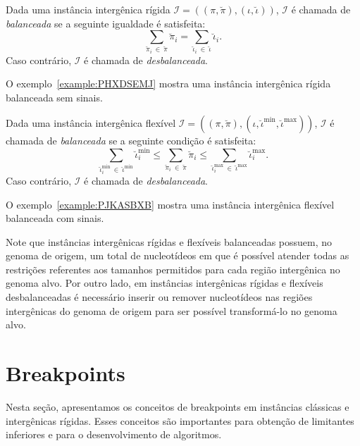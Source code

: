 

\begin{definition}
  Dada uma instância intergênica rígida $\mathcal{I} = ((\pi,\breve\pi),(\iota,\breve\iota))$, $\mathcal{I}$ é chamada de \emph{balanceada} se a seguinte igualdade é satisfeita: 
  $$\sum_{\breve\pi_i~\in~\breve\pi}\breve\pi_i = \sum_{\breve\iota_i~\in~\breve\iota}\breve\iota_i.$$
  Caso contrário, $\mathcal{I}$ é chamada de \emph{desbalanceada}.
\end{definition}

O exemplo~\ref{example:PHXDSEMJ} mostra uma instância intergênica rígida balanceada sem sinais.



\begin{definition}
  Dada uma instância intergênica flexível $\mathcal{I} = ((\pi,\breve\pi),(\iota,\breve\iota^{\min},\breve\iota^{\max}))$, $\mathcal{I}$ é chamada de \emph{balanceada} se a seguinte condição é satisfeita: 
  $$\sum_{\breve\iota^{\min}_i~\in~\breve\iota^{\min}} \breve\iota^{\min}_i \le \sum_{\breve\pi_i~\in~\breve\pi} \breve\pi_i \le \sum_{\breve\iota^{\max}_i~\in~\breve\iota^{\max}}{\breve\iota^{\max}_i}.$$
  Caso contrário, $\mathcal{I}$ é chamada de \emph{desbalanceada}.
\end{definition}

O exemplo~\ref{example:PJKASBXB} mostra uma instância intergênica flexível balanceada com sinais.



Note que instâncias intergênicas rígidas e flexíveis balanceadas possuem, no genoma de origem, um total de nucleotídeos em que é possível atender todas as restrições referentes aos tamanhos permitidos para cada região intergênica no genoma alvo. Por outro lado, em instâncias intergênicas rígidas e flexíveis desbalanceadas é necessário inserir ou remover nucleotídeos nas regiões intergênicas do genoma de origem para ser possível transformá-lo no genoma alvo.

\section{Breakpoints}

Nesta seção, apresentamos os conceitos de breakpoints em instâncias clássicas e intergênicas rígidas. Esses conceitos são importantes para obtenção de limitantes inferiores e para o desenvolvimento de algoritmos.

